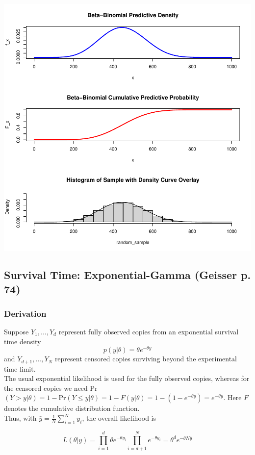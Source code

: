 \documentclass[12pt, a4paper]{article}
\begin{document}
\includegraphics{Thesis_v3-003}


    \subsection{Survival Time:  Exponential-Gamma (Geisser p. 74)}
    \subsubsection{Derivation}

      Suppose $Y_1,...,Y_d$ represent fully observed copies from an exponential survival time density
          $$p(y|\theta) = \theta e^{-\theta y}$$
      and $Y_{d+1},...,Y_N$ represent censored copies surviving beyond the experimental time limit.  \\

\noindent The usual exponential likelihood is used for the fully observed copies, whereas for the censored copies we need Pr$(Y > y | \theta) = 1 - \text{Pr}(Y\leq y | \theta) = 1 - F(y|\theta) = 1 - (1 - e^{-\theta y}) = e^{-\theta y}$.  Here $F$ denotes the cumulative distribution function.\\

\noindent Thus, with $\bar{y} = \frac{1}{N}\sum_{i=1}^N y_i$, the overall likelihood is

      $$L(\theta|y) = \prod_{i=1}^d\theta e^{-\theta y_i}\prod_{i=d+1}^N e^{-\theta y_i} = \theta^d e^{-\theta N\bar{y}}$$
\end{document}
